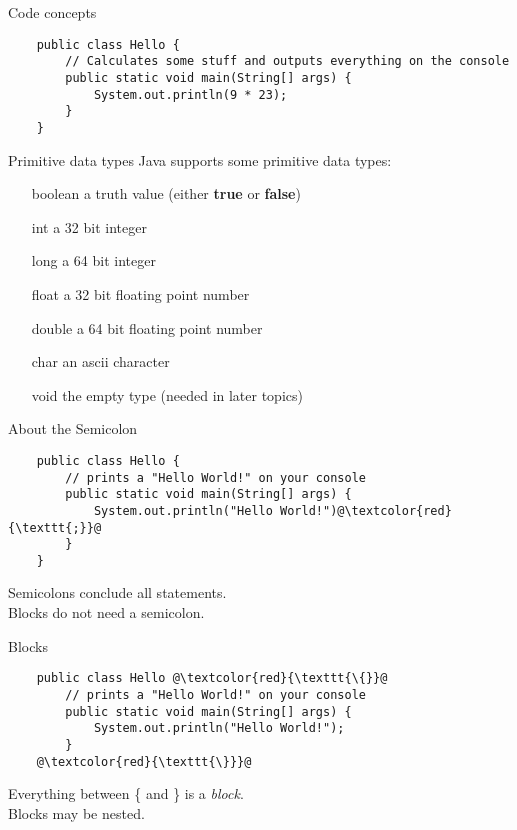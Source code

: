\begin{frame}[fragile]{Code concepts}
	\begin{lstlisting}
	public class Hello {
	    // Calculates some stuff and outputs everything on the console
	    public static void main(String[] args) {
	        System.out.println(9 * 23);
	    }
	}
	\end{lstlisting}
\end{frame}

\begin{frame}{Primitive data types}
	Java supports some primitive data types:
	\begin{itemize}
		\item[boolean] a truth value (either \textbf{true} or \textbf{false})
		\item[int] a 32 bit integer
		\item[long] a 64 bit integer
		\item[float] a 32 bit floating point number
		\item[double] a 64 bit floating point number
		\item[char] an ascii character
		\item[void] the empty type (needed in later topics)
	\end{itemize}
\end{frame}

\begin{frame}[fragile]{About the Semicolon}
	\begin{lstlisting}
	public class Hello {
	    // prints a "Hello World!" on your console
	    public static void main(String[] args) {
	        System.out.println("Hello World!")@\textcolor{red}{\texttt{;}}@
	    }
	}
	\end{lstlisting}
	Semicolons conclude all statements. \\
	Blocks do not need a semicolon.
\end{frame}

\begin{frame}[fragile]{Blocks}
	\begin{lstlisting}
	public class Hello @\textcolor{red}{\texttt{\{}}@
	    // prints a "Hello World!" on your console
	    public static void main(String[] args) {
	        System.out.println("Hello World!");
	    }
	@\textcolor{red}{\texttt{\}}}@
	\end{lstlisting}
	Everything between \{ and \} is a \emph{block}. \\
	Blocks may be nested.
\end{frame}

